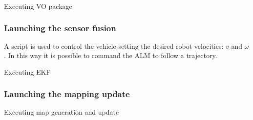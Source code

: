 Executing VO package



\subsubsection{Launching the sensor fusion}
\noindent A script is used to control the vehicle setting the desired robot velocities: $v$ and $\omega$.
In this way it is possible to command the \gls{ALM} to follow a trajectory.

Executing EKF

\subsubsection{Launching the mapping update}
\noindent
Executing map generation and update




\cleardoublepage
